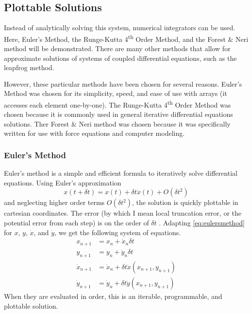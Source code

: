 \documentclass[preprint,titlepage,preprintnumbers,amsmath,amssymb,aps,11pt]{revtex4-2}
\begin{document}
\subsection{Plottable Solutions}
Instead of analytically solving this system, numerical integrators can be used. Here, Euler's Method, the Runge-Kutta 4\textsuperscript{th} Order Method, and the Forest \& Neri method will be demonstrated. There are many other methods that allow for approximate solutions of systems of coupled differential equations, such as the leapfrog method.

However, these particular methods have been chosen for several reasons. Euler's Method was chosen for its simplicity, speed, and ease of use with arrays (it accesses each element one-by-one). The Runge-Kutta 4\textsuperscript{th} Order Method was chosen because it is commonly used in general iterative differential equations solutions. Ther Forest \& Neri method was chosen because it was specifically written for use with force equations and computer modeling.

\subsubsection{Euler's Method}\label{sec:euler}
Euler's method is a simple and efficient formula to iteratively solve differential equations. Using Euler's approximation
\begin{equation}
    x(t+\delta t)=x(t)+\delta t\dot{x}(t)+O(\delta t^2)
    \label{eq:eulersmethod}
\end{equation}
and neglecting higher order terms $O(\delta t^2)$, the solution is quickly plottable in cartesian coordinates. The error (by which I mean local truncation error, or the potential error from each step) is on the order of $\delta t$ \cite[p. 298]{Wild1980}.
Adapting \ref{eq:eulersmethod} for $x$, $y$, $\dot{x}$, and $\dot{y}$, we get the following system of equations.
\begin{equation}
    \begin{aligned}
        x_{n+1}       & =x_n+\dot{x}_n\delta t                       \\
        y_{n+1}       & =y_n+\dot{y}_n\delta t                       \\
        \dot{x}_{n+1} & =\dot{x}_n+\delta t\ddot{x}(x_{n+1},y_{n+1}) \\
        \dot{y}_{n+1} & =\dot{y}_n+\delta t\ddot{y}(x_{n+1},y_{n+1})
    \end{aligned}
\end{equation}
When they are evaluated in order, this is an iterable, programmable, and plottable solution.
\end{document}
